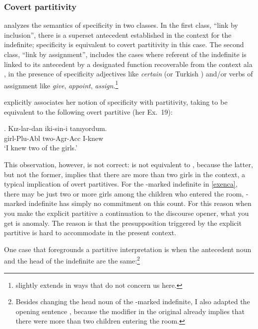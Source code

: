 \documentclass[11pt,a4paper]{article}
\begin{document}
\subsubsection{Covert partitivity}
\label{sccovertpartitivity}

 analyzes the semantics of specificity in two classes.
In the first class, ``link by inclusion'', there is a superset
antecedent established in the context for the indefinite; specificity
is equivalent to covert partitivity in this case. The second class,
``link by assignment'', includes the cases where referent of the
indefinite is linked to its antecedent by a designated function
recoverable from the context ala \cite{hintikka86}, in the presence of
specificity adjectives like \emph{certain} (or Turkish
) and/or verbs of assignment like \emph{give},
\emph{appoint}, \emph{assign}.\footnote{\cite{enc91} slightly extends
\cite{hintikka86} in ways that do not concern us here.}

\cite{enc91} explicitly associates her notion of specificity with
partitivity, taking  to be equivalent to the
following overt partitive (her Ex.\ 19):

\ex.\label{exovertpart} Kız-lar-dan iki-sin-i tanıyordum.\\
girl-Plu-Abl two-Agr-Acc I-knew\\
`I knew two of the girls.'

This observation, however, is not correct:  is not
equivalent to , because the latter, but not the
former, implies that there are more than two girls in the context, a
typical implication of overt partitives. For the \acc-marked
indefinite in \ref{exenca}, there may be just two or more girls among
the children who entered the room, \acc-marked indefinite has simply
no commitment on this count. For this reason when you make the
explicit partitive a continuation to the discourse opener, what you
get is anomaly. The reason is that the presupposition triggered by the
explicit partitive is hard to accommodate in the present context.

One case that foregrounds a partitive interpretation is when the
antecedent noun and the head of the indefinite are the
same:\footnote{Besides changing the head noun of the \acc-marked
indefinite, I also adapted the opening sentence
, because the modifier
 in the original already implies that
there were more than two children entering the room.}
\end{document}
